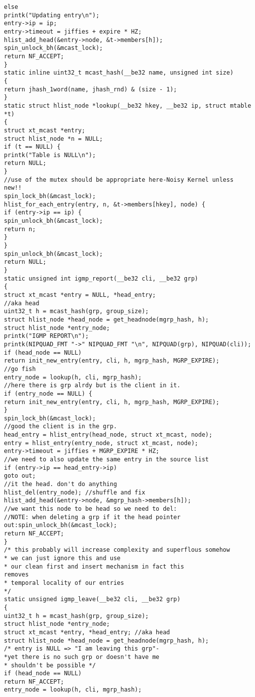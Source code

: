 \begin{verbatim}
else
printk("Updating entry\n");
entry->ip = ip;
entry->timeout = jiffies + expire * HZ;
hlist_add_head(&entry->node, &t->members[h]);
spin_unlock_bh(&mcast_lock);
return NF_ACCEPT;
}
static inline uint32_t mcast_hash(__be32 name, unsigned int size)
{
return jhash_1word(name, jhash_rnd) & (size - 1);
}
static struct hlist_node *lookup(__be32 hkey, __be32 ip, struct mtable *t)
{
struct xt_mcast *entry;
struct hlist_node *n = NULL;
if (t == NULL) {
printk("Table is NULL\n");
return NULL;
}
//use of the mutex should be appropriate here-Noisy Kernel unless new!!
spin_lock_bh(&mcast_lock);
hlist_for_each_entry(entry, n, &t->members[hkey], node) {
if (entry->ip == ip) {
spin_unlock_bh(&mcast_lock);
return n;
}
}
spin_unlock_bh(&mcast_lock);
return NULL;
}
static unsigned int igmp_report(__be32 cli, __be32 grp)
{
struct xt_mcast *entry = NULL, *head_entry;
//aka head
uint32_t h = mcast_hash(grp, group_size);
struct hlist_node *head_node = get_headnode(mgrp_hash, h);
struct hlist_node *entry_node;
printk("IGMP REPORT\n");
printk(NIPQUAD_FMT "->" NIPQUAD_FMT "\n", NIPQUAD(grp), NIPQUAD(cli));
if (head_node == NULL)
return init_new_entry(entry, cli, h, mgrp_hash, MGRP_EXPIRE);
//go fish
entry_node = lookup(h, cli, mgrp_hash);
//here there is grp alrdy but is the client in it.
if (entry_node == NULL) {
return init_new_entry(entry, cli, h, mgrp_hash, MGRP_EXPIRE);
}
spin_lock_bh(&mcast_lock);
//good the client is in the grp.
head_entry = hlist_entry(head_node, struct xt_mcast, node);
entry = hlist_entry(entry_node, struct xt_mcast, node);
entry->timeout = jiffies + MGRP_EXPIRE * HZ;
//we need to also update the same entry in the source list
if (entry->ip == head_entry->ip)
goto out;
//it the head. don't do anything
hlist_del(entry_node); //shuffle and fix
hlist_add_head(&entry->node, &mgrp_hash->members[h]);
//we want this node to be head so we need to del:
//NOTE: when deleting a grp if it the head pointer
out:spin_unlock_bh(&mcast_lock);
return NF_ACCEPT;
}
/* this probably will increase complexity and superflous somehow
* we can just ignore this and use
* our clean first and insert mechanism in fact this
removes
* temporal locality of our entries
*/
static unsigned igmp_leave(__be32 cli, __be32 grp)
{
uint32_t h = mcast_hash(grp, group_size);
struct hlist_node *entry_node;
struct xt_mcast *entry, *head_entry; //aka head
struct hlist_node *head_node = get_headnode(mgrp_hash, h);
/* entry is NULL => "I am leaving this grp"-
*yet there is no such grp or doesn't have me
* shouldn't be possible */
if (head_node == NULL)
return NF_ACCEPT;
entry_node = lookup(h, cli, mgrp_hash);

\end{verbatim}
